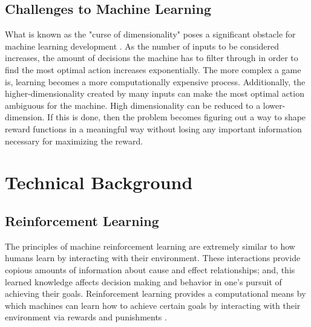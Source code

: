 \documentclass[10pt,twocolumn]{article}
\begin{document}
\subsection{Challenges to Machine Learning}
What is known as the "curse of dimensionality" poses a significant obstacle for machine learning development \cite{karanam_2021}. As the number of inputs to be considered increases, the amount of decisions the machine has to filter through in order to find the most optimal action increases exponentially. The more complex a game is, learning becomes a more computationally expensive process. Additionally, the higher-dimensionality created by many inputs can make the most optimal action ambiguous for the machine. High dimensionality can be reduced to a lower-dimension. If this is done, then the problem becomes figuring out a way to shape reward functions in a meaningful way without losing any important information necessary for maximizing the reward.



\section{Technical Background}

\subsection{Reinforcement Learning}
The principles of machine reinforcement learning are extremely similar to how humans learn by interacting with their environment. These interactions provide copious amounts of information about cause and effect relationships; and, this learned knowledge affects decision making and behavior in one's pursuit of achieving their goals. Reinforcement learning provides a computational means by which machines can learn how to achieve certain goals by interacting with their environment via rewards and punishments \cite{Sutton1998}. 
\end{document}

